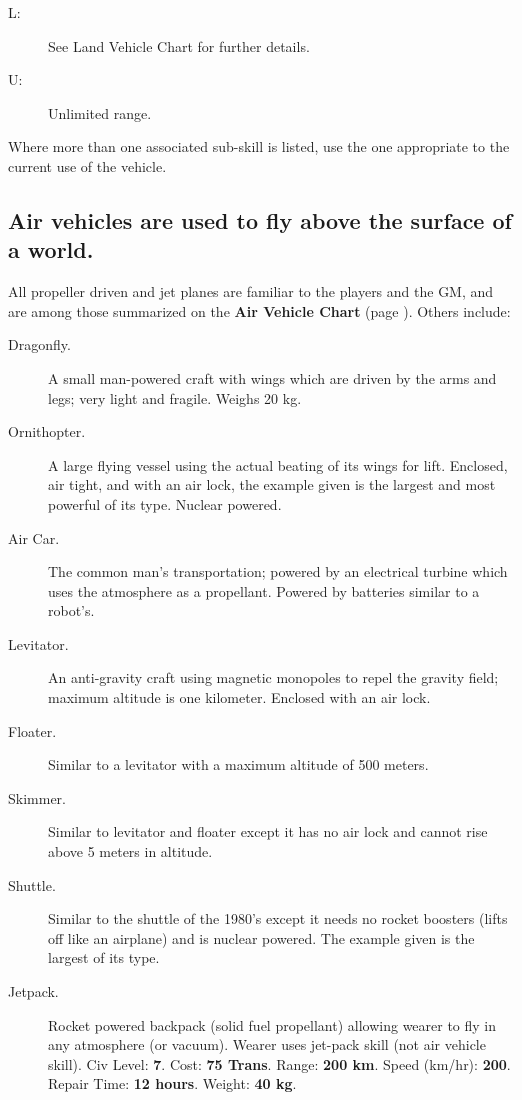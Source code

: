 \begin{table}[htbp]
{\begin{minipage}{5.75in}
      \medskip

      \parbox{\textwidth}{\begin{description}
        \item[L:] See Land Vehicle Chart for further details. 
        \item[U:] Unlimited range. 
        \end{description}
        
        Where more than one associated sub-skill is listed, use the one
        appropriate to the current use of the vehicle.}
    \end{minipage}}
\end{table}

\subsection[Air Vehicles]{Air vehicles are used to fly above the
  surface of a world.}
\label{sec:air-vehicles}

All propeller driven and jet planes are familiar to the players and
the GM, and are among those summarized on the \textbf{Air Vehicle
  Chart} (page \pageref{tab:air-vehicles}). Others include:

\begin{description}
\item[Dragonfly.] A small man-powered craft with wings which are
  driven by the arms and legs; very light and fragile.  Weighs 20 kg.
\item[Ornithopter.] A large flying vessel using the actual beating of
  its wings for lift. Enclosed, air tight, and with an air lock, the
  example given is the largest and most powerful of its type. Nuclear
  powered.
\item[Air Car.] The common man's transportation; powered by an
  electrical turbine which uses the atmosphere as a propellant.
  Powered by batteries similar to a robot's.
\item[Levitator.] An anti-gravity craft using magnetic monopoles to
  repel the gravity field; maximum altitude is one kilometer. Enclosed
  with an air lock.
\item[Floater.] Similar to a levitator with a maximum altitude of 500
  meters.
\item[Skimmer.] Similar to levitator and floater except it has no air
  lock and cannot rise above 5 meters in altitude.
\item[Shuttle.] Similar to the shuttle of the 1980's except it needs
  no rocket boosters (lifts off like an airplane) and is nuclear
  powered.
The example given is the largest of its
type.\label{sec:air-vehicles-change-largest}
\item[\hypertarget{tag:jetpack}{Jetpack}.] Rocket powered backpack (solid fuel propellant)
  allowing wearer to fly in any atmosphere (or vacuum). Wearer uses
  jet-pack skill (not air vehicle skill). Civ Level: \textbf{7}. Cost:
  \textbf{75 Trans}. Range: \textbf{200 km}. Speed (km/hr):
  \textbf{200}. Repair Time: \textbf{12 hours}.  Weight: \textbf{40
    kg}.
\end{description}

